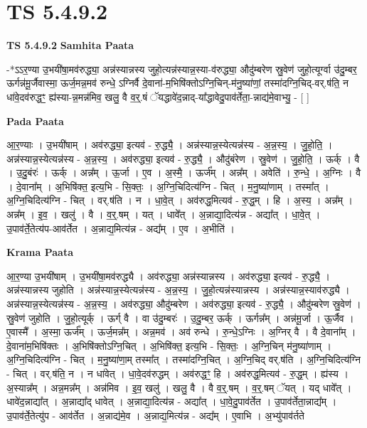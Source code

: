 \documentclass[17pt]{extarticle}
\begin{document}
\section{ TS 5.4.9.2 }

\textbf{TS 5.4.9.2 } \newline
\textbf{Samhita Paata} \newline

-*ऽऽर॒ण्या उ॒भयी॑षा॒मव॑रुद्ध्या॒ अन्न॑स्यान्नस्य जुहो॒त्यन्न॑स्यान्न॒स्या-व॑रुद्ध्या॒ औदु॑म्बरेण स्रु॒वेण॑ जुहो॒त्यूर्ग्वा उ॑दु॒म्बर॒ ऊर्गन्न॑मू॒र्जैवास्मा॒ ऊर्ज॒मन्न॒मव॑ रुन्धे॒ ऽग्निर्वै दे॒वाना॑-म॒भिषि॑क्तोऽग्नि॒चिन्-म॑नु॒ष्या॑णां॒ तस्मा॑दग्नि॒चिद्-वर्.ष॑ति॒ न धा॑वे॒दव॑रुद्धꣳ॒॒ ह्य॑स्या-न्न॒मन्न॑मिव॒ खलु॒ वै व॒र्॒.षं ॅयद्धावे॑द॒न्नाद्-या᳚द्धावेदु॒पाव॑र्तेता॒-न्नाद्य॑मे॒वाभ्यु॒ - [  ] \newline

\textbf{Pada Paata} \newline

आ॒र॒ण्याः । उ॒भयी॑षाम् । अव॑रुद्ध्या॒ इत्यव॑ - रु॒द्ध्यै॒ । अन्न॑स्यान्न॒स्येत्यन्न॑स्य - अ॒न्न॒स्य॒ । जु॒हो॒ति॒ । अन्न॑स्यान्न॒स्येत्यन्न॑स्य - अ॒न्न॒स्य॒ । अव॑रुद्ध्या॒ इत्यव॑ - रु॒द्ध्यै॒ । औदु॑बंरेण । स्रु॒वेण॑ । जु॒हो॒ति॒ । ऊर्क् । वै । उ॒दु॒बंरः॑ । ऊर्क् । अन्न᳚म् । ऊ॒र्जा । ए॒व । अ॒स्मै॒ । ऊर्ज᳚म् । अन्न᳚म् । अवेति॑ । रु॒न्धे॒ । अ॒ग्निः । वै । दे॒वाना᳚म् । अ॒भिषि॑क्त॒ इत्य॒भि - सि॒क्तः॒ । अ॒ग्नि॒चिदित्य॑ग्नि - चित् । म॒नु॒ष्या॑णाम् । तस्मा᳚त् । अ॒ग्नि॒चिदित्य॑ग्नि - चित् । वर्.ष॑ति । न । धा॒वे॒त् । अव॑रुद्ध॒मित्यव॑ - रु॒द्ध॒म् । हि । अ॒स्य॒ । अन्न᳚म् । अन्न᳚म् । इ॒व॒ । खलु॑ । वै । व॒र्॒.षम् । यत् । धावे᳚त् । अ॒न्नाद्या॒दित्य॑न्न - अद्या᳚त् । धा॒वे॒त् । उ॒पाव॑र्ते॒तेत्य॑प-आव॑र्तेत । अ॒न्नाद्य॒मित्य॑न्न - अद्य᳚म् । ए॒व । अ॒भीति॑ ।  \newline


\textbf{Krama Paata} \newline

आ॒र॒ण्या उ॒भयी॑षाम् । उ॒भयी॑षा॒मव॑रुद्ध्यै । अव॑रुद्ध्या॒ अन्न॑स्यान्नस्य । अव॑रुद्ध्या॒ इत्यव॑ - रु॒द्ध्यै॒ । अन्न॑स्यान्नस्य जुहोति । अन्न॑स्यान्न॒स्येत्यन्न॑स्य - अ॒न्न॒स्य॒ । जु॒हो॒त्यन्न॑स्यान्नस्य । अन्न॑स्यान्न॒स्याव॑रुद्ध्यै । अन्न॑स्यान्न॒स्येत्यन्न॑स्य - अ॒न्न॒स्य॒ । अव॑रुद्ध्या॒ औदु॑म्बरेण । अव॑रुद्ध्या॒ इत्यव॑ - रु॒द्ध्यै॒ । औदु॑म्बरेण स्रु॒वेण॑ । स्रु॒वेण॑ जुहोति । जु॒हो॒त्यूर्क् । ऊर्ग् वै । वा उ॑दु॒म्बरः॑ । उ॒दु॒म्बर॒ ऊर्क् । ऊर्गन्न᳚म् । अन्न॑मू॒र्जा । ऊ॒र्जैव । ए॒वास्मै᳚ । अ॒स्मा॒ ऊर्ज᳚म् । ऊर्ज॒मन्न᳚म् । अन्न॒मव॑ । अव॑ रुन्धे । रु॒न्धे॒ऽग्निः । अ॒ग्निर् वै । वै दे॒वाना᳚म् । दे॒वाना॑म॒भिषि॑क्तः । अ॒भिषि॑क्तोऽग्नि॒चित् । अ॒भिषि॑क्त॒ इत्य॒भि - सि॒क्तः॒ । अ॒ग्नि॒चिन् म॑नु॒ष्या॑णाम् । अ॒ग्नि॒चिदित्य॑ग्नि - चित् । म॒नु॒ष्या॑णा॒म् तस्मा᳚त् । तस्मा॑दग्नि॒चित् । अ॒ग्नि॒चिद् वर्.ष॑ति । अ॒ग्नि॒चिदित्य॑ग्नि - चित् । वर्.ष॑ति॒ न । न धा॑वेत् । धा॒वे॒दव॑रुद्धम् । अव॑रुद्धꣳ॒॒ हि । अव॑रुद्ध॒मित्यव॑ - रु॒द्ध॒म् । ह्य॑स्य । अ॒स्यान्न᳚म् । अन्न॒मन्न᳚म् । अन्न॑मिव । इ॒व॒ खलु॑ । खलु॒ वै । वै व॒र्॒.षम् । व॒र्॒.षम् ॅयत् । यद् धावे᳚त् । धावे॑द॒न्नाद्या᳚त् । अ॒न्नाद्या᳚द् धावेत् । अ॒न्नाद्या॒दित्य॑न्न - अद्या᳚त् । धा॒वे॒दु॒पाव॑र्तेत । उ॒पाव॑र्तेता॒न्नाद्य᳚म् । उ॒पाव॑र्ते॒तेत्यु॑प - आव॑र्तेत । अ॒न्नाद्य॑मे॒व । अ॒न्नाद्य॒मित्य॑न्न - अद्य᳚म् । ए॒वाभि । अ॒भ्यु॑पाव॑र्तते \newline
\end{document}
